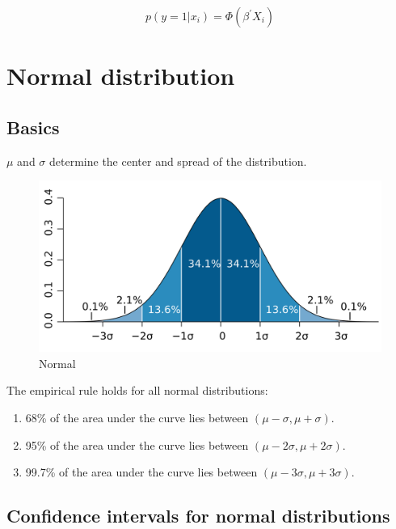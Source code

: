 \documentclass[]{book}
\begin{document}
\[p(y=1|x_i)=\Phi(\beta^{'}X_i)\]

\hypertarget{normal-distribution}{%
\chapter{Normal distribution}\label{normal-distribution}}

\hypertarget{basics-1}{%
\section{Basics}\label{basics-1}}

\(\mu\) and \(\sigma\) determine the center and spread of the distribution.

\begin{figure}
\centering
\includegraphics{Standard_deviation_diagram.PNG}
\caption{Normal}
\end{figure}

The empirical rule holds for all normal distributions:

\begin{enumerate}
\def\labelenumi{(\arabic{enumi})}
\item
  68\% of the area under the curve lies between \((\mu-\sigma,\mu+\sigma)\).
\item
  95\% of the area under the curve lies between \((\mu-2\sigma,\mu+2\sigma)\).
\item
  99.7\% of the area under the curve lies between \((\mu-3\sigma,\mu+3\sigma)\).
\end{enumerate}

\hypertarget{confidence-intervals-for-normal-distributions}{%
\section{Confidence intervals for normal distributions}\label{confidence-intervals-for-normal-distributions}}
\end{document}
